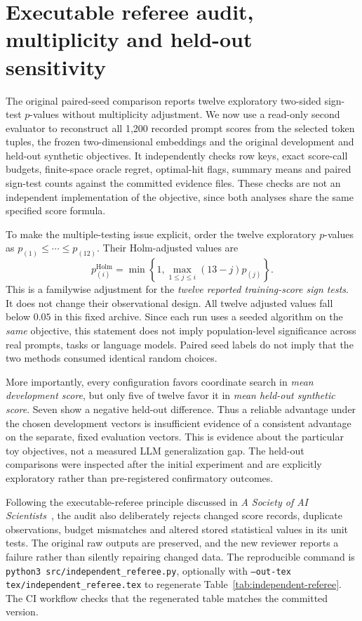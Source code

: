 \section{Executable referee audit, multiplicity and held-out sensitivity}
\label{sec:independent-referee}
The original paired-seed comparison reports twelve exploratory two-sided
sign-test $p$-values without multiplicity adjustment. We now use a read-only
second evaluator to reconstruct all 1,200 recorded prompt scores from the
selected token tuples, the frozen two-dimensional embeddings and the
original development and held-out synthetic objectives. It independently
checks row keys, exact score-call budgets, finite-space oracle regret,
optimal-hit flags, summary means and paired sign-test counts against
the committed evidence files. These checks are not an independent
implementation of the objective, since both analyses share the same
specified score formula.

To make the multiple-testing issue explicit, order the twelve exploratory
$p$-values as $p_{(1)}\leq\cdots\leq p_{(12)}$. Their Holm-adjusted values are
\begin{equation}
p^{\mathrm{Holm}}_{(i)}=
\min\left\{1,\max_{1\leq j\leq i}(13-j)p_{(j)}\right\}.
\label{eq:holm}
\end{equation}
This is a familywise adjustment for the \emph{twelve reported training-score
sign tests}. It does not change their observational design. All twelve
adjusted values fall below $0.05$ in this fixed archive. Since each run
uses a seeded algorithm on the \emph{same} objective, this statement does
not imply population-level significance across real prompts, tasks or
language models. Paired seed labels do not imply that the two methods
consumed identical random choices.

More importantly, every configuration favors coordinate search in
\emph{mean development score}, but only five of twelve favor it in
\emph{mean held-out synthetic score}. Seven show a negative held-out
difference. Thus a reliable advantage under the chosen development
vectors is insufficient evidence of a consistent advantage on the
separate, fixed evaluation vectors. This is evidence about the particular
toy objectives, not a measured LLM generalization gap. The held-out
comparisons were inspected after the initial experiment and are explicitly
exploratory rather than pre-registered confirmatory outcomes.

Following the executable-referee principle discussed in
\emph{A Society of AI Scientists}~\cite{ahmad2026}, the audit also
deliberately rejects changed score records, duplicate observations,
budget mismatches and altered stored statistical values in its unit
tests. The original raw outputs are preserved, and the new reviewer
reports a failure rather than silently repairing changed data.
The reproducible command is
\texttt{python3 src/independent\_referee.py}, optionally with
\texttt{--out-tex tex/independent\_referee.tex} to regenerate
Table~\ref{tab:independent-referee}. The CI workflow checks that
the regenerated table matches the committed version.
